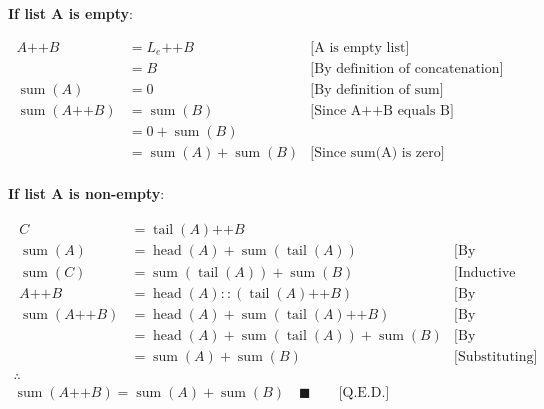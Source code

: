 \textbf{If list A is empty}:

\begin{equation*}
\begin{aligned}
A \mathbin{\texttt{++}} B & = L_e \mathbin{\texttt{++}} B & \text{[A is empty list]} \\
& = B & \text{[By definition of concatenation]} \\
\operatorname{sum}(A) & = 0 & \text{[By definition of sum]} \\
\operatorname{sum}(A \mathbin{\texttt{++}} B) & = \operatorname{sum}(B) & \text{[Since A} \mathbin{\texttt{++}} \text{B equals B]} \\
& = 0 + \operatorname{sum}(B) \\
& = \operatorname{sum}(A) + \operatorname{sum}(B) & \text{[Since sum(A) is zero]} \\
\end{aligned}
\end{equation*}

\textbf{If list A is non-empty}:

\begin{gather*}
\begin{aligned}
C & = \operatorname{tail}(A) \mathbin{\texttt{++}} B \\
\operatorname{sum}(A) & = \operatorname{head}(A) + \operatorname{sum}(\operatorname{tail}(A)) & \text{[By definition of sum]} \\
\operatorname{sum}(C) & = \operatorname{sum}(\operatorname{tail}(A)) + \operatorname{sum}(B) & \text{[Inductive Step]} \\
A \mathbin{\texttt{++}} B & = \operatorname{head}(A) :: (\operatorname{tail}(A) \mathbin{\texttt{++}} B) & \text{[By definition of head and tail]} \\
\operatorname{sum}(A \mathbin{\texttt{++}} B) & = \operatorname{head}(A) + \operatorname{sum}(\operatorname{tail}(A) \mathbin{\texttt{++}} B) & \text{[By definition of sum]} \\
& = \operatorname{head}(A) + \operatorname{sum}(\operatorname{tail}(A)) + \operatorname{sum}(B) & \text{[By definition of C]} \\
& = \operatorname{sum}(A) + \operatorname{sum}(B) & \text{[Substituting]}
\end{aligned} \\
\therefore \\
\operatorname{sum}(A \mathbin{\texttt{++}} B) = \operatorname{sum}(A) + \operatorname{sum}(B) \quad \blacksquare \qquad \text{[Q.E.D.]}
\end{gather*}

